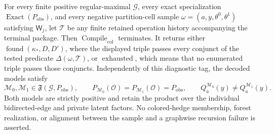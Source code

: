 For every finite positive regular-maximal \(\mathcal G\), every exact specialization \(\operatorname{Exact}(P_{\mathrm{obs}})\), and every negative partition-cell sample \(\omega=(a,y,\theta^0,\theta^1)\) satisfying \(\mathsf W_j\), let \(\mathcal T\) be any finite retained operation history accompanying the terminal package. Then \(\operatorname{Compile}_{\mathrm{col}}\) terminates. It returns either \(\operatorname{found}(\kappa_*,D,D')\), where the displayed triple passes every conjunct of the tested predicate \(\Delta(\omega,\mathcal T)\), or \(\operatorname{exhausted}\), which means that no enumerated triple passes those conjuncts. Independently of this diagnostic tag, the decoded models satisfy
\[
\mathcal M_0,\mathcal M_1\in\mathfrak F(\mathcal G,P_{\mathrm{obs}}),
\qquad
P_{\mathcal M_0}(\mathcal O)=P_{\mathcal M_1}(\mathcal O)=P_{\mathrm{obs}},
\qquad
Q_a^{\mathcal M_0}(y)\neq Q_a^{\mathcal M_1}(y).
\]
Both models are strictly positive and retain the product over the individual bidirected-edge and private latent factors. No colored-hedge membership, forest realization, or alignment between the sample and a graphwise recursion failure is asserted.